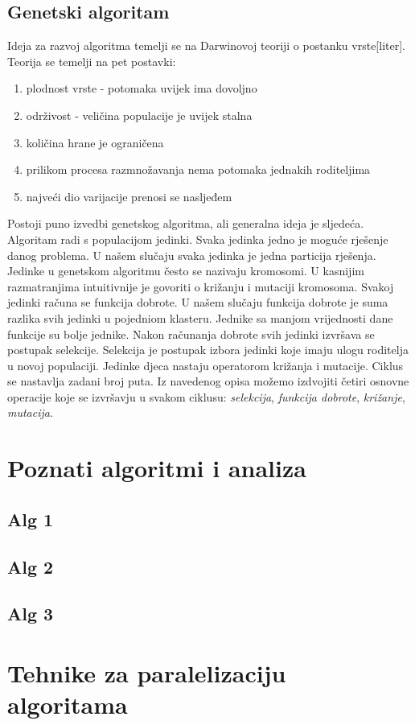 \documentclass[a4paper,twoside,12pt]{memoir} %
\begin{document}
\section{Genetski algoritam}
Ideja za razvoj algoritma temelji se na Darwinovoj teoriji o postanku vrste[liter]. Teorija se temelji na pet postavki:
\begin{enumerate}
\item plodnost vrste - potomaka uvijek ima dovoljno
\item održivost - veličina populacije je uvijek stalna
\item količina hrane je ograničena
\item prilikom procesa razmnožavanja nema potomaka jednakih roditeljima
\item najveći dio varijacije prenosi se nasljeđem
\end{enumerate}
Postoji puno izvedbi genetskog algoritma, ali generalna ideja je sljedeća. Algoritam radi s populacijom jedinki. Svaka jedinka jedno je moguće rješenje danog problema. U našem slučaju svaka jedinka je jedna particija rješenja. Jedinke u genetskom algoritmu često se nazivaju kromosomi. U kasnijim razmatranjima intuitivnije je govoriti o križanju i mutaciji kromosoma. Svakoj jedinki računa se funkcija dobrote. U našem slučaju funkcija dobrote je suma razlika svih jedinki u pojedniom klasteru. Jednike sa manjom vrijednosti dane funkcije su bolje jednike. Nakon računanja dobrote svih jedinki izvršava se postupak selekcije. Selekcija je postupak izbora jedinki koje imaju ulogu roditelja u novoj populaciji. Jedinke djeca nastaju operatorom križanja i mutacije. Ciklus se nastavlja zadani broj puta.
Iz navedenog opisa možemo izdvojiti četiri osnovne operacije koje se izvršavju u svakom ciklusu: \textit{selekcija}, \textit{funkcija dobrote}, \textit{križanje}, \textit{mutacija}. 
\chapter{Poznati algoritmi i analiza}
\section{Alg 1}
\section{Alg 2}
\section{Alg 3}
\chapter{Tehnike za paralelizaciju algoritama}
\end{document}
